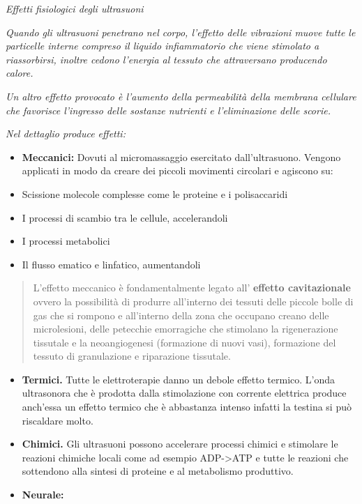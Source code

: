 \documentclass[]{article}
\begin{document}
\emph{Effetti fisiologici degli ultrasuoni}

\emph{Quando gli ultrasuoni penetrano nel corpo, l'effetto delle
vibrazioni muove tutte le particelle interne compreso il liquido
infiammatorio che viene stimolato a riassorbirsi, inoltre cedono
l'energia al tessuto che attraversano producendo calore.}

\emph{Un altro effetto provocato è l'aumento della permeabilità della
membrana cellulare che favorisce l'ingresso delle sostanze nutrienti e
l'eliminazione delle scorie.}

\emph{Nel dettaglio produce effetti:}

\begin{itemize}
\item
  \textbf{Meccanici:} Dovuti al micromassaggio esercitato
  dall'ultrasuono. Vengono applicati in modo da creare dei piccoli
  movimenti circolari e agiscono su:
\end{itemize}

\begin{itemize}
\item
  Scissione molecole complesse come le proteine e i polisaccaridi
\item
  I processi di scambio tra le cellule, accelerandoli
\item
  I processi metabolici
\item
  Il flusso ematico e linfatico, aumentandoli
\end{itemize}

\begin{quote}
L'effetto meccanico è fondamentalmente legato all' \textbf{effetto
cavitazionale} ovvero la possibilità di produrre all'interno dei tessuti
delle piccole bolle di gas che si rompono e all'interno della zona che
occupano creano delle microlesioni, delle petecchie emorragiche che
stimolano la rigenerazione tissutale e la neoangiogenesi (formazione di
nuovi vasi), formazione del tessuto di granulazione e riparazione
tissutale.
\end{quote}

\begin{itemize}
\item
  \textbf{Termici.} Tutte le elettroterapie danno un debole effetto
  termico. L'onda ultrasonora che è prodotta dalla stimolazione con
  corrente elettrica produce anch'essa un effetto termico che è
  abbastanza intenso infatti la testina si può riscaldare molto.
\item
  \textbf{Chimici.} Gli ultrasuoni possono accelerare processi chimici e
  stimolare le reazioni chimiche locali come ad esempio
  ADP-\textgreater{}ATP e tutte le reazioni che sottendono alla sintesi
  di proteine e al metabolismo produttivo.
\item
  \textbf{Neurale:}
\end{itemize}
\end{document}
